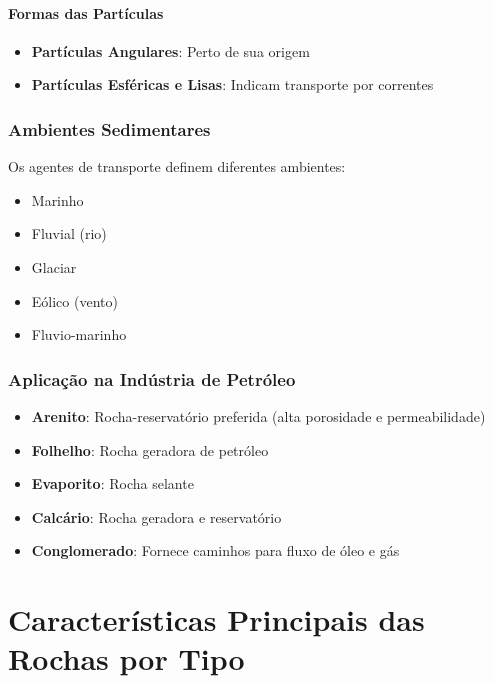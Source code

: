 \documentclass[12pt,a4paper,twoside]{book}
\begin{document}
\paragraph{Formas das Partículas}

\begin{itemize}
    \item \textbf{Partículas Angulares}: Perto de sua origem
    \item \textbf{Partículas Esféricas e Lisas}: Indicam transporte por correntes
\end{itemize}

\subsubsection{Ambientes Sedimentares}

Os agentes de transporte definem diferentes ambientes:
\begin{itemize}
    \item Marinho
    \item Fluvial (rio)
    \item Glaciar
    \item Eólico (vento)
    \item Fluvio-marinho
\end{itemize}

\subsubsection{Aplicação na Indústria de Petróleo}

\begin{itemize}
    \item \textbf{Arenito}: Rocha-reservatório preferida (alta porosidade e permeabilidade)
    \item \textbf{Folhelho}: Rocha geradora de petróleo
    \item \textbf{Evaporito}: Rocha selante
    \item \textbf{Calcário}: Rocha geradora e reservatório
    \item \textbf{Conglomerado}: Fornece caminhos para fluxo de óleo e gás
\end{itemize}

\section{Características Principais das Rochas por Tipo}
\end{document}

